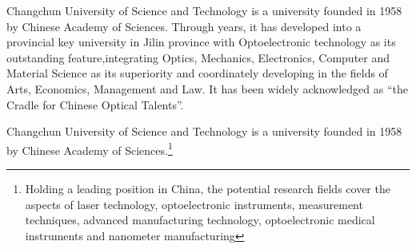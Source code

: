 Changchun University of Science and Technology is a university founded in 1958 by Chinese Academy of Sciences. Through years, it has developed into a provincial key university in Jilin province with Optoelectronic technology as its outstanding feature,integrating Optics, Mechanics, Electronics, Computer and Material Science as its superiority and coordinately developing in the fields of Arts, Economics, Management and Law. It has been widely acknowledged as “the Cradle for Chinese Optical Talents”.

Changchun University of Science and Technology is a university founded in 1958 by Chinese Academy of Sciences.\footnote{Holding a leading position in China, the potential research fields cover the aspects of laser technology, optoelectronic instruments, measurement techniques, advanced manufacturing technology, optoelectronic medical instruments and nanometer manufacturing}
